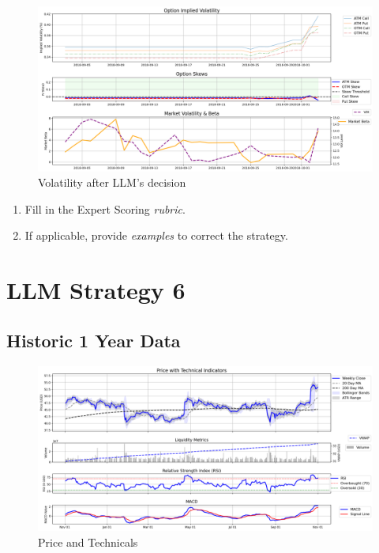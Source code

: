 \documentclass[8pt]{scrartcl}
\begin{document}
\begin{figure}[H]
    \centering
    \includegraphics[width=1\linewidth]{judge_reviews/AMZN_M_gpt-4o-mini/2018-09-03/llm_Market_Volatility_&_Beta.png}
    \caption{Volatility after LLM's decision}
\end{figure}

\begin{tcolorbox}[colback=blue!10, colframe=blue!60, title=\textbf{TASKS}, sharp corners=southwest]
\begin{enumerate}
    \item Fill in the Expert Scoring \textit{rubric}.
    \item If applicable, provide \textit{examples} to correct the strategy.
\end{enumerate}
\end{tcolorbox}

\newpage


\section*{LLM Strategy 6}
\label{app:s6}

\subsection*{Historic 1 Year Data}

\begin{figure}[H]
    \centering
    \includegraphics[width=1\linewidth]{judge_reviews/MSFT_M_gpt-4o-mini/2015-11-02/judge_Price_with_Technical_Indicators.png}
    \caption{Price and Technicals}
\end{figure}
\end{document}
